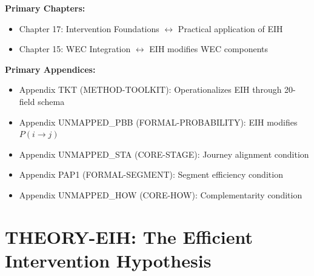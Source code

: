\begin{tcolorbox}[colback=purple!5!white, colframe=purple!75!black,
    title=Chapter Linkage]

\textbf{Primary Chapters:}
\begin{itemize}[nosep]
\item Chapter 17: Intervention Foundations $\leftrightarrow$ Practical application of EIH
\item Chapter 15: WEC Integration $\leftrightarrow$ EIH modifies WEC components
\end{itemize}

\textbf{Primary Appendices:}
\begin{itemize}[nosep]
\item Appendix TKT (METHOD-TOOLKIT): Operationalizes EIH through 20-field schema
\item Appendix UNMAPPED_PBB (FORMAL-PROBABILITY): EIH modifies $P(i \to j)$
\item Appendix UNMAPPED_STA (CORE-STAGE): Journey alignment condition
\item Appendix PAP1 (FORMAL-SEGMENT): Segment efficiency condition
\item Appendix UNMAPPED_HOW (CORE-HOW): Complementarity condition
\end{itemize}

\end{tcolorbox}


\chapter{THEORY-EIH: The Efficient Intervention Hypothesis}
\label{app:theory-eih}


\begin{abstract}
Why do most behavioral interventions underperform expectations? This appendix
proposes a formal answer: the \textbf{Efficient Intervention Hypothesis (EIH)}.
We prove that intervention effectiveness is bounded by three alignment conditions:
journey phase alignment ($\mu$), segment fit ($\sigma$), and portfolio complementarity
($\gamma$). An intervention achieves its theoretical maximum only when all three
conditions are satisfied simultaneously. Violations explain the systematic 60-70\%
underperformance observed in applied behavioral science. The EIH provides testable
predictions and a normative framework for intervention design.
\end{abstract}

